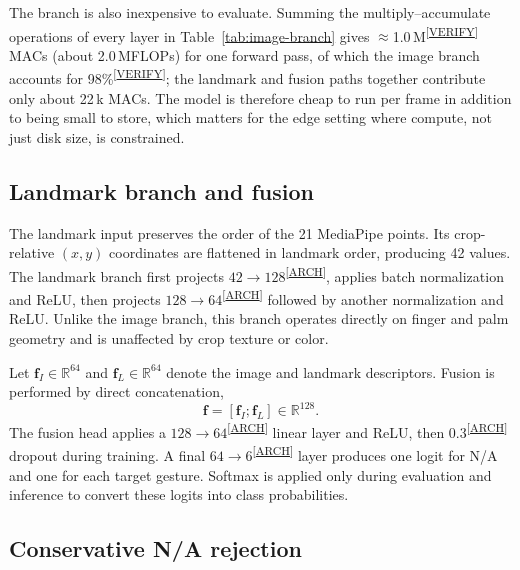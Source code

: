 \documentclass[10pt,twocolumn,a4paper]{article}
\newcommand{\evidence}[1]{\textsuperscript{\scriptsize[\hyperref[ev:#1]{#1}]}}
\newcommand{\result}[2]{#1\evidence{#2}}
\begin{document}
The branch is also inexpensive to evaluate. Summing the multiply--accumulate
operations of every layer in Table~\ref{tab:image-branch} gives
\result{$\approx$1.0\,M}{VERIFY} MACs (about 2.0\,MFLOPs) for one forward pass,
of which the image branch accounts for \result{98\%}{VERIFY}; the landmark and
fusion paths together contribute only about 22\,k MACs. The model is therefore
cheap to run per frame in addition to being small to store, which matters for
the edge setting where compute, not just disk size, is constrained.

\subsection{Landmark branch and fusion}

The landmark input preserves the order of the 21 MediaPipe points. Its
crop-relative $(x,y)$ coordinates are flattened in landmark order, producing
42 values. The landmark branch first projects
\result{$42{\to}128$}{ARCH}, applies batch normalization and ReLU, then
projects \result{$128{\to}64$}{ARCH} followed by another normalization and
ReLU. Unlike the image branch, this branch operates directly on finger and
palm geometry and is unaffected by crop texture or color.

Let $\mathbf{f}_{I}\in\mathbb{R}^{64}$ and
$\mathbf{f}_{L}\in\mathbb{R}^{64}$ denote the image and landmark descriptors.
Fusion is performed by direct concatenation,
\begin{equation}
\mathbf{f}=[\mathbf{f}_{I};\mathbf{f}_{L}]\in\mathbb{R}^{128}.
\end{equation}
The fusion head applies a \result{$128{\to}64$}{ARCH} linear layer and ReLU,
then \result{0.3}{ARCH} dropout during training. A final
\result{$64{\to}6$}{ARCH} layer produces one logit for N/A and one for each
target gesture. Softmax is applied only during evaluation and inference to
convert these logits into class probabilities.

\subsection{Conservative N/A rejection}
\end{document}
